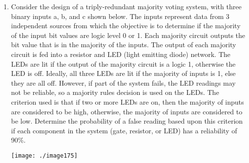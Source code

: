 \begin{enumerate}
\item
  Consider the design of a triply-redundant majority voting system, with
  three binary inputs a, b, and c shown below. The inputs represent data
  from 3 independent sources from which the objective is to determine if
  the majority of the input bit values are logic level 0 or 1. Each
  majority circuit outputs the bit value that is in the majority of the
  inputs. The output of each majority circuit is fed into a resistor and
  LED (light emitting diode) network. The LEDs are lit if the output of
  the majority circuit is a logic 1, otherwise the LED is off. Ideally,
  all three LEDs are lit if the majority of inputs is 1, else they are
  all off. However, if part of the system fails, the LED readings may
  not be reliable, so a majority rules decision is used on the LEDs. The
  criterion used is that if two or more LEDs are on, then the majority
  of inputs are considered to be high, otherwise, the majority of inputs
  are considered to be low. Determine the probability of a false reading
  based upon this criterion if each component in the system (gate,
  resistor, or LED) has a reliability of 90\%.

\texttt{[image: ./image175]}

\end{enumerate}

